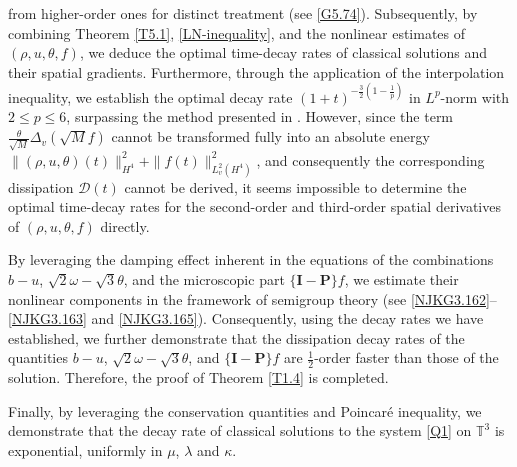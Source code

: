 \documentclass[reqno,11pt]{amsart}
\theoremstyle{plain}
\numberwithin{equation}{section}
\begin{document}
from higher-order  {ones} for distinct treatment (see \eqref{G5.74}). 
Subsequently, by   combining  Theorem \ref{T5.1}, \eqref{LN-inequality}, 
and the nonlinear estimates of $(\rho,u,\theta,f)$, 
we deduce the optimal time-decay rates of classical solutions and their spatial gradients. Furthermore,
 through the application of the interpolation inequality, we establish the optimal decay rate 
$(1+t)^{-\frac{3}{2} (1-\frac{1}{p} )}$ in $L^p$-norm with $2\leq p\leq 6$, 
surpassing the method presented in \cite{Mu-Wang-20} .
 However, since the term $\frac{\theta}{\sqrt{M}}\Delta_v(\sqrt{M}f)$ cannot be transformed fully 
into an absolute energy $\|(\rho,u,\theta)(t)\|_{H^4}^2+\|f(t)\|_{L_v^2(H^4)}^2$, 
and consequently the corresponding dissipation $\mathcal{D}(t)$ cannot be derived, 
it seems impossible to determine the optimal time-decay rates for the second-order 
and third-order spatial derivatives of $(\rho,u,\theta,f)$ directly. 

 By leveraging the damping effect inherent in the equations of the  combinations $b-u$, $\sqrt{2}\omega - \sqrt{3}\theta$, 
 and  the microscopic part $\{\mathbf{I} - \mathbf{P}\}f$, we estimate their nonlinear 
 components in the framework of semigroup theory (see \eqref{NJKG3.162}–\eqref{NJKG3.163} and
  \eqref{NJKG3.165}). Consequently, using the decay rates we have established, we further 
  demonstrate that the dissipation decay rates of 
 the quantities $b - u$, $\sqrt{2}\omega - \sqrt{3}\theta$, and $\{\mathbf{I} - 
 \mathbf{P}\}f$ are $\frac{1}{2}$-order faster than those of the solution. 
 Therefore, the proof of Theorem \ref{T1.4} is completed. 

Finally, by leveraging the  conservation quantities and Poincar\'{e} inequality, 
we demonstrate that the decay rate of  classical solutions to the system \eqref{Q1} 
on $\mathbb{T}^3$ is exponential,  uniformly in  $\mu$,  $\lambda$  and
$\kappa$.
\end{document}
